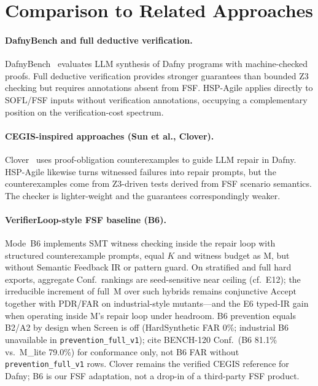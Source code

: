 \section{Comparison to Related Approaches}
\label{sec:disc:related}

\paragraph{DafnyBench and full deductive verification.}
DafnyBench~\citep{loughridge2024dafnybench} evaluates LLM synthesis of Dafny
programs with machine-checked proofs.
Full deductive verification provides stronger guarantees than bounded Z3
checking but requires annotations absent from FSF.
HSP-Agile applies directly to SOFL/FSF inputs without verification
annotations, occupying a complementary position on the verification-cost
spectrum.

\paragraph{CEGIS-inspired approaches (Sun et al., Clover).}
Clover~\citep{sun2024clover} uses proof-obligation counterexamples to guide
LLM repair in Dafny.
HSP-Agile likewise turns witnessed failures into repair prompts, but the
counterexamples come from Z3-driven tests derived from FSF scenario semantics.
The checker is lighter-weight and the guarantees correspondingly weaker.

\paragraph{VerifierLoop-style FSF baseline (B6).}
Mode~B6 implements SMT witness checking inside the repair loop with structured
counterexample prompts, equal $K$ and witness budget as M, but without
Semantic Feedback IR or pattern guard.
On stratified and full hard exports, aggregate Conf.\ rankings are
seed-sensitive near ceiling (cf.\ E12); the irreducible increment of full~M
over such hybrids remains conjunctive $\mathrm{Accept}$ together with
PDR/FAR on industrial-style mutants---and the E6 typed-IR gain when operating
inside M's repair loop under headroom.
B6 prevention equals B2/A2 by design when Screen is off (HardSynthetic FAR
0\%; industrial B6 unavailable in \texttt{prevention\_full\_v1}); cite
BENCH-120 Conf.\ (B6 81.1\% vs.\ M\_lite 79.0\%) for conformance only, not
B6 FAR without \texttt{prevention\_full\_v1} rows.
Clover remains the verified CEGIS reference for Dafny; B6 is our FSF
adaptation, not a drop-in of a third-party FSF product.

